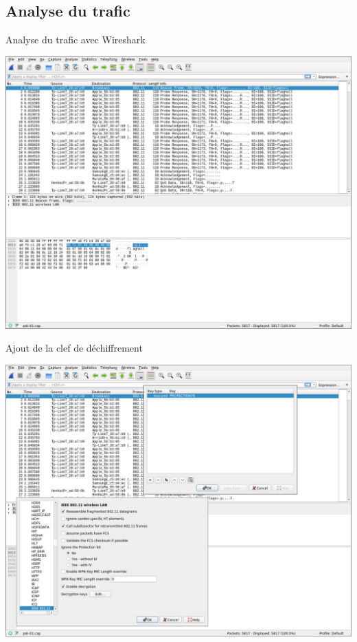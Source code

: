 \documentclass[10pt,sans,usenames,dvipsnames,french,compress]{beamer}
\begin{document}
\subsection{Analyse du trafic}
\begin{frame}{Analyse du trafic  avec Wireshark}
	\vspace{-2mm}
	\begin{center}
		\includegraphics[width=0.85\linewidth]{118/wireshark0}
	\end{center}
\end{frame}

\begin{frame}{Ajout de la clef de déchiffrement}
	\vspace{-2mm}
	\begin{center}
		\includegraphics[width=0.85\linewidth]{118/wireshark1}
	\end{center}
\end{frame}
\end{document}
